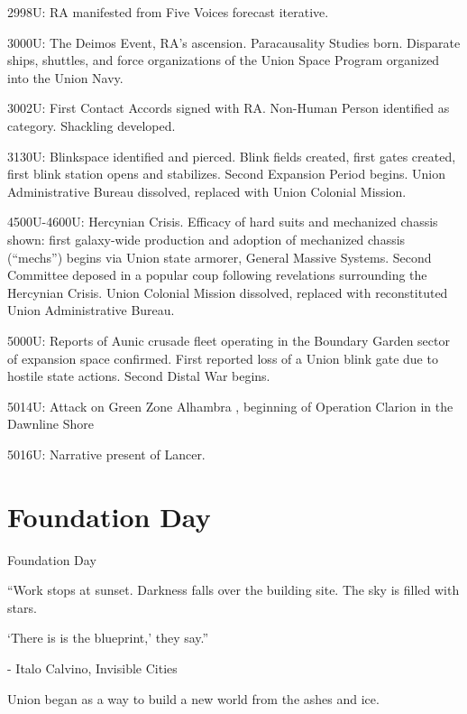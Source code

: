 2998U: RA manifested from Five Voices forecast iterative.     
 

3000U: The Deimos Event, RA’s ascension. Paracausality Studies born. Disparate ships, shuttles,  
and force organizations of the Union Space Program organized into the Union Navy.  
 

                                                                                                                  


3002U: First Contact Accords signed with RA. Non-Human Person identified as category.  
Shackling developed. 
 

3130U: Blinkspace identified and pierced. Blink fields created, first gates created, first blink  
station opens and stabilizes. Second Expansion Period begins. Union Administrative Bureau  
dissolved, replaced with Union Colonial Mission.  
 

4500U-4600U: Hercynian Crisis. Efficacy of hard suits and mechanized chassis shown: first  
galaxy-wide production and adoption of mechanized chassis (“mechs”) begins via Union state  
armorer, General Massive Systems. Second Committee deposed in a popular coup following  
revelations surrounding the Hercynian Crisis. Union Colonial Mission dissolved, replaced with  
reconstituted Union Administrative Bureau.  
 

5000U: Reports of Aunic crusade fleet operating in the Boundary Garden sector of expansion  
space confirmed. First reported loss of a Union blink gate due to hostile state actions. Second  
Distal War begins. 
 

5014U: Attack on Green Zone Alhambra , beginning of Operation Clarion in the Dawnline Shore
 

5016U: Narrative present of Lancer. 
 

\section{Foundation Day}

Foundation Day  

         “Work stops at sunset. Darkness falls over the building site. The sky is filled with stars.   

         ‘There is is the blueprint,’ they say.”  

                      -    Italo Calvino, Invisible Cities  

Union began as a way to build a new world from the ashes and ice. 
 

